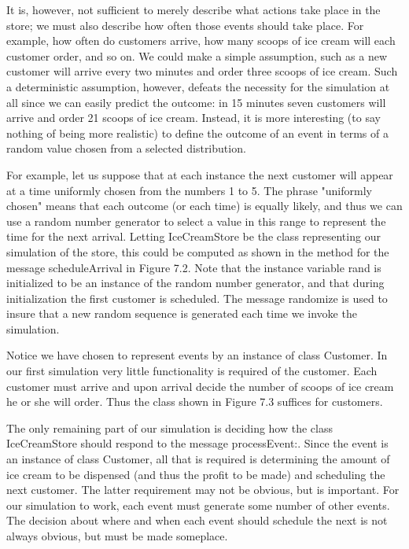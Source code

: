 It is, however, not sufficient to merely describe what actions take place in the
store; we must also describe how often those events should take place. For
example, how often do customers arrive, how many scoops of ice cream will each
customer order, and so on. We could make a simple assumption, such as a new
customer will arrive every two minutes and order three scoops of ice cream. Such
a deterministic assumption, however, defeats the necessity for the simulation at
all since we can easily predict the outcome: in 15 minutes seven customers will
arrive and order 21 scoops of ice cream. Instead, it is more interesting (to say
nothing of being more realistic) to define the outcome of an event in terms of a
random value chosen from a selected distribution.

For example, let us suppose that at each instance the next customer will appear
at a time uniformly chosen from the numbers 1 to 5. The phrase "uniformly
chosen" means that each outcome (or each time) is equally likely, and thus we
can use a random number generator to select a value in this range to represent
the time for the next arrival. Letting IceCreamStore be the class representing
our simulation of the store, this could be computed as shown in the method for
the message scheduleArrival in Figure 7.2. Note that the instance variable rand
is initialized to be an instance of the random number generator, and that during
initialization the first customer is scheduled. The message randomize is used to
insure that a new random sequence is generated each time we invoke the
simulation.


Notice we have chosen to represent events by an instance of class Customer. In
our first simulation very little functionality is required of the customer. Each
customer must arrive and upon arrival decide the number of scoops of ice cream
he or she will order. Thus the class shown in Figure 7.3 suffices for customers.

The only remaining part of our simulation is deciding how the class
IceCreamStore should respond to the message processEvent:. Since the event is an
instance of class Customer, all that is required is determining the amount of
ice cream to be dispensed (and thus the profit to be made) and scheduling the
next customer. The latter requirement may not be obvious, but is important. For
our simulation to work, each event must generate some number of other events.
The decision about where and when each event should schedule the next is not
always obvious, but must be made someplace.

